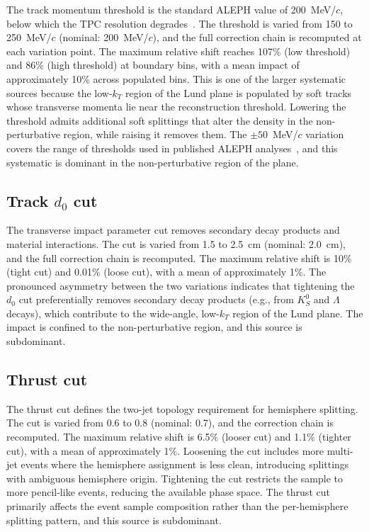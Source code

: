 \documentclass[11pt,a4paper]{article}
\begin{document}
The track momentum threshold is the standard ALEPH value of
200~MeV/$c$, below which the TPC resolution degrades~\cite{ALEPH:1998hhr}.
The threshold is varied from 150 to 250~MeV/$c$ (nominal: 200~MeV/$c$),
and the full correction chain is recomputed at each variation point.  The
maximum relative shift reaches 107\% (low threshold) and 86\% (high
threshold) at boundary bins, with a mean impact of approximately 10\%
across populated bins.  This is one of the larger systematic sources because
the low-$k_T$ region of the Lund plane is populated by soft tracks whose
transverse momenta lie near the reconstruction threshold.  Lowering the
threshold admits additional soft splittings that alter the density in the
non-perturbative region, while raising it removes them.  The $\pm 50$~MeV/$c$
variation covers the range of thresholds used in published ALEPH
analyses~\cite{ALEPH:1998hhr}, and this systematic is dominant in the
non-perturbative region of the plane.

\subsection{Track $d_0$ cut}
\label{sec:syst-d0}

The transverse impact parameter cut removes secondary decay products
and material interactions.  The cut is varied from 1.5 to 2.5~cm
(nominal: 2.0~cm), and the full correction chain is recomputed.  The
maximum relative shift is 10\% (tight cut) and 0.01\% (loose cut),
with a mean of approximately 1\%.  The pronounced asymmetry between
the two variations indicates that tightening the $d_0$ cut
preferentially removes secondary decay products (e.g., from
$K^0_S$ and $\Lambda$ decays), which contribute to the wide-angle,
low-$k_T$ region of the Lund plane.  The impact is confined to the
non-perturbative region, and this source is subdominant.

\subsection{Thrust cut}
\label{sec:syst-thrust}

The thrust cut defines the two-jet topology requirement for
hemisphere splitting.  The cut is varied from 0.6 to 0.8 (nominal:
0.7), and the correction chain is recomputed.  The maximum relative
shift is 6.5\% (looser cut) and 1.1\% (tighter cut), with a mean of
approximately 1\%.  Loosening the cut includes more multi-jet events
where the hemisphere assignment is less clean, introducing splittings
with ambiguous hemisphere origin.  Tightening the cut restricts the
sample to more pencil-like events, reducing the available phase space.
The thrust cut primarily affects the event sample composition rather
than the per-hemisphere splitting pattern, and this source is
subdominant.
\end{document}
